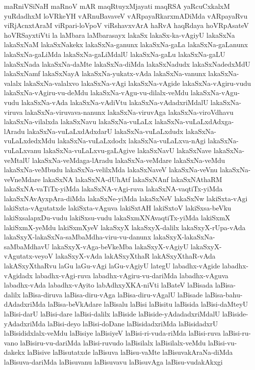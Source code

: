 {maRniVSiNaH
maRnoV
mAR
maqRtuyxMjayati
maqRSA
yaRcuCxkalxM
yuRdadhxM
loVRkeYH
vARnuBavaveV
vARpayaRkarxmADiMda
vARpayaRvu
viRjAcnxtAraM
viRpari-loVpoV
viRshavxvArA
haRvA
haqRdaya
hoVRpAsateV
hoVRSayxtiVti
la
laMbara
laMbarasayx
lakaSx
lakaSx-ka-vAgiyU
lakaSxNa
lakaSxNaM
lakaSxNakekx
lakaSxNa-ganunx
lakaSxNa-gaLa
lakaSxNa-gaLanunx
lakaSxNa-gaLiMda
lakaSxNa-gaLiMdalU
lakaSxNa-gaLu
lakaSxNa-gaLU
lakaSxNada
lakaSxNa-daMte
lakaSxNa-diMda
lakaSxNadudx
lakaSxNadedxMdU
lakaSxNamf
lakaSxNayA
lakaSxNa-yukatx-vAda
lakaSxNa-vanunx
lakaSxNa-valalx
lakaSxNa-valalxvo
lakaSxNa-vAgi
lakaSxNa-vAgide
lakaSxNa-vAgiru-vudu
lakaSxNa-vAgiru-vu-deMdu
lakaSxNa-vAgu-vu-dilalx-veMdu
lakaSxNa-vAgu-vudu
lakaSxNa-vAda
lakaSxNa-vAdiVtu
lakaSxNa-vAdadxriMdalU
lakaSxNa-viruva
lakaSxNa-viruvava-nanunx
lakaSxNa-viruvAga
lakaSxNa-viroVdhavu
lakaSxNa-vilalxda
lakaSxNavu
lakaSxNa-vuLaLx
lakaSxNa-vuLaLxdAdxga-lAradu
lakaSxNa-vuLaLxdAdxdarU
lakaSxNa-vuLaLxdudx
lakaSxNa-vuLaLxdedxMdu
lakaSxNa-vuLaLxdodx
lakaSxNa-vuLaLxva-nAgi
lakaSxNa-vuLaLxvanu
lakaSxNa-vuLaLxvu-gaLAgive
lakaSxNavU
lakaSxNave
lakaSxNa-veMtalU
lakaSxNa-veMdaga-lAradu
lakaSxNa-veMdare
lakaSxNa-veMdu
lakaSxNa-veMbudu
lakaSxNa-velilxMda
lakaSxNaveV
lakaSxNa-veVnu
lakaSxNa-veVneMdare
lakaSxNA
lakaSxNA-dUhAtf
lakaSxNAnf
lakaSxNAthaRM
lakaSxNA-vaTiTx-yiMda
lakaSxNA-vAgi-ruva
lakaSxNA-vaqtiTx-yiMda
lakaSxNAvAyxpAra-diMda
lakaSxNe-yiMda
lakaSxNeV
lakaSxNw
lakiSxta-vAgi
lakiSxta-vAgutatxde
lakiSxta-vAguva
lakiSxtAH
lakiSxtoV
lakiSxsa-beVku
lakiSxsalapxDu-vudu
lakiSxsu-vudu
lakaSxmXNAvaqtiTx-yiMda
lakiSxmX
lakiSxmX-yeMdu
lakiSxmXyeV
lakaSxyX
lakaSxyX-dalilx
lakaSxyX-rUpa-vAda
lakaSxyX-lakaSxNa-saMbaMdha-viru-vu-danunx
lakaSxyX-lakaSxNa-saMbaMdhavU
lakaSxyX-vAga-beVkeMba
lakaSxyX-vAgiyU
lakaSxyX-vAgutatx-veyoV
lakaSxyX-vAda
lakASxyXthaR
lakASxyXthaR-vAda
lakASxyXthaRvu
laGu
laGu-vAgi
laGu-vAgiyU
lategU
labadhx-vAgide
labadhx-vAgidadx
labadhx-vAgi-ruva
labadhx-vAgiru-vu-dariMda
labadhx-vAguva
labadhx-vAda
labadhx-vAyito
labAdhxyXKA-niVti
laBateV
laBisada
laBisa-dalilx
laBisa-diruva
laBisa-diru-vAga
laBisa-diru-vAgalU
laBisade
laBisa-bahu-dAdadxriMda
laBisa-beVkAdare
laBisalu
laBisi
laBisitu
laBisida
laBisi-daMteyU
laBisi-darU
laBisi-dare
laBisi-dalilx
laBiside
laBiside-yAdadadxriMdalU
laBiside-yAdadxriMda
laBisi-deyo
laBisi-doDane
laBisidadxriMda
laBisidadxrU
laBisididxlalx-veMdu
laBisiye
laBisiyeV
laBisi-ri-vuda-riMda
laBisi-ruva
laBisi-ru-vano
laBisiru-vu-dariMda
laBisi-ruvudo
laBisilalx
laBisilalx-veMdu
laBisi-vu-dakekx
laBisive
laBisutatxde
laBisuva
laBisu-vaMte
laBisuvakAraNa-diMda
laBisuva-dariMda
laBisuvanu
laBisuvavu
laBisuvAga
laBisu-vudakAkxgi
}

